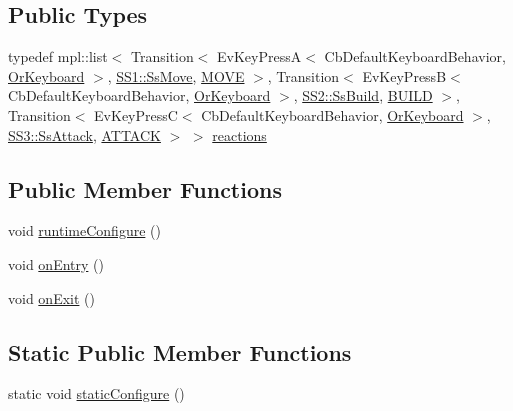 \subsection*{Public Types}
\begin{DoxyCompactItemize}
\item 
typedef mpl\+::list$<$ Transition$<$ Ev\+Key\+PressA$<$ Cb\+Default\+Keyboard\+Behavior, \hyperlink{classsm__starcraft__ai_1_1OrKeyboard}{Or\+Keyboard} $>$, \hyperlink{structsm__starcraft__ai_1_1SS1_1_1SsMove}{S\+S1\+::\+Ss\+Move}, \hyperlink{structsm__starcraft__ai_1_1StObserve_1_1MOVE}{M\+O\+VE} $>$, Transition$<$ Ev\+Key\+PressB$<$ Cb\+Default\+Keyboard\+Behavior, \hyperlink{classsm__starcraft__ai_1_1OrKeyboard}{Or\+Keyboard} $>$, \hyperlink{structsm__starcraft__ai_1_1SS2_1_1SsBuild}{S\+S2\+::\+Ss\+Build}, \hyperlink{structsm__starcraft__ai_1_1StObserve_1_1BUILD}{B\+U\+I\+LD} $>$, Transition$<$ Ev\+Key\+PressC$<$ Cb\+Default\+Keyboard\+Behavior, \hyperlink{classsm__starcraft__ai_1_1OrKeyboard}{Or\+Keyboard} $>$, \hyperlink{structsm__starcraft__ai_1_1SS3_1_1SsAttack}{S\+S3\+::\+Ss\+Attack}, \hyperlink{structsm__starcraft__ai_1_1StObserve_1_1ATTACK}{A\+T\+T\+A\+CK} $>$ $>$ \hyperlink{structsm__starcraft__ai_1_1StObserve_ad3194a0d80ad2e5f716d6821abc0a551}{reactions}
\end{DoxyCompactItemize}
\subsection*{Public Member Functions}
\begin{DoxyCompactItemize}
\item 
void \hyperlink{structsm__starcraft__ai_1_1StObserve_afcc3c6aecc44b88f421a3e9990f7efb4}{runtime\+Configure} ()
\item 
void \hyperlink{structsm__starcraft__ai_1_1StObserve_a3e75089d398dedc4e2f000035d58fc22}{on\+Entry} ()
\item 
void \hyperlink{structsm__starcraft__ai_1_1StObserve_ab5f55cf98f24160bf1841f026efa003b}{on\+Exit} ()
\end{DoxyCompactItemize}
\subsection*{Static Public Member Functions}
\begin{DoxyCompactItemize}
\item 
static void \hyperlink{structsm__starcraft__ai_1_1StObserve_a9aa04128ad0fb18454d9ea2db4edca48}{static\+Configure} ()
\end{DoxyCompactItemize}
